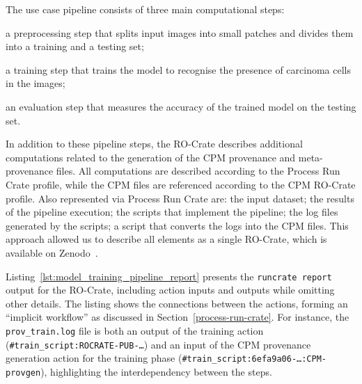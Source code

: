 \documentclass[10pt,letterpaper]{article}
\begin{document}
The use case pipeline consists of three main computational steps:
\begin{inlineenum}
\item a preprocessing step that splits input images into small patches and divides them into a training and a testing set;
\item a training step that trains the model to recognise the presence of carcinoma cells in the images;
\item an evaluation step that measures the accuracy of the trained model on the testing set.
\end{inlineenum}
In addition to these pipeline steps, the RO-Crate describes additional computations related to the generation of the CPM provenance and meta-provenance files.
All computations are described according to the Process Run Crate profile, while the CPM files are referenced according to the CPM RO-Crate profile. 
Also represented via Process Run Crate are: the input dataset; the results of the pipeline execution; the scripts that implement the pipeline; the log files generated by the scripts; a script that converts the logs into the CPM files.
This approach allowed us to describe all elements as a single RO-Crate, which
is available on Zenodo~\cite{Wittner 2023a}.

Listing~\ref{lst:model_training_pipeline_report} presents the \texttt{runcrate report} output for the RO-Crate,
including action inputs and outputs while omitting other details. The listing shows the connections between the actions, forming an ``implicit workflow'' as discussed in Section~\ref{process-run-crate}. For instance, the \texttt{prov\_train.log} file is both an output of the training action (\texttt{\#train\_script:ROCRATE-PUB-\ldots}) and an input of the CPM provenance generation action for the training phase (\texttt{\#train\_script:6efa9a06-\ldots:CPM-provgen}), highlighting the interdependency between the steps.
\end{document}
